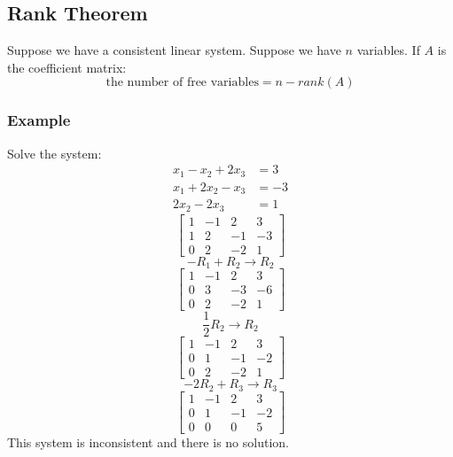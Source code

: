 \documentclass{math}
\begin{document}
\subsection*{Rank Theorem}
Suppose we have a consistent linear system. Suppose we have \( n \) variables.
If \( A \) is the coefficient matrix:
\[ \text{the number of free variables} = n-rank(A) \]

\subsubsection*{Example}
Solve the system:
\begin{align*}
  x_1-x_2+2x_3 &= 3 \\
  x_1+2x_2-x_3 &= -3 \\
  2x_2-2x_3 &= 1
\end{align*}
\[ \left[\begin{array}{ccc|c}
  1 & -1 & 2 & 3 \\
  1 & 2 & -1 & -3 \\
  0 & 2 & -2 & 1
\end{array}\right] \]
\[ -R_1+R_2 \to R_2 \]
\[ \left[\begin{array}{ccc|c}
  1 & -1 & 2 & 3 \\
  0 & 3 & -3 & -6 \\
  0 & 2 & -2 & 1
\end{array}\right] \]
\[ \frac{1}{2}R_2 \to R_2 \]
\[ \left[\begin{array}{ccc|c}
  1 & -1 & 2 & 3 \\
  0 & 1 & -1 & -2 \\
  0 & 2 & -2 & 1
\end{array}\right] \]
\[ -2R_2+R_3 \to R_3 \]
\[ \left[\begin{array}{ccc|c}
  1 & -1 & 2 & 3 \\
  0 & 1 & -1 & -2 \\
  0 & 0 & 0 & 5
\end{array}\right] \]
This system is inconsistent and there is no solution.
\end{document}
